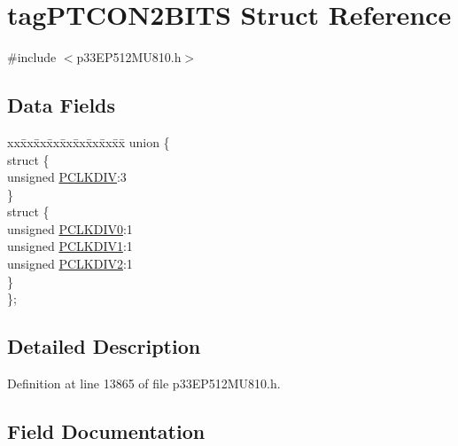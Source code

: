 \hypertarget{structtag_p_t_c_o_n2_b_i_t_s}{}\section{tag\+P\+T\+C\+O\+N2\+B\+I\+TS Struct Reference}
\label{structtag_p_t_c_o_n2_b_i_t_s}


{\ttfamily \#include $<$p33\+E\+P512\+M\+U810.\+h$>$}

\subsection*{Data Fields}
\begin{DoxyCompactItemize}
\item 
\begin{tabbing}
xx\=xx\=xx\=xx\=xx\=xx\=xx\=xx\=xx\=\kill
union \{\\
\>struct \{\\
\>\>unsigned \hyperlink{structtag_p_t_c_o_n2_b_i_t_s_a1d6ebf745e14e65a0a5ce03b92be678f}{PCLKDIV}:3\\
\>\} \\
\>struct \{\\
\>\>unsigned \hyperlink{structtag_p_t_c_o_n2_b_i_t_s_a4babd593aa4d5301df370110fccaab93}{PCLKDIV0}:1\\
\>\>unsigned \hyperlink{structtag_p_t_c_o_n2_b_i_t_s_a47741aceac6a8ba4602843a6e4c31e51}{PCLKDIV1}:1\\
\>\>unsigned \hyperlink{structtag_p_t_c_o_n2_b_i_t_s_a8ddd287d47ae49f7593f9e051fc67c00}{PCLKDIV2}:1\\
\>\} \\
\}; \\

\end{tabbing}\end{DoxyCompactItemize}


\subsection{Detailed Description}


Definition at line 13865 of file p33\+E\+P512\+M\+U810.\+h.



\subsection{Field Documentation}
\mbox{\label{structtag_p_t_c_o_n2_b_i_t_s_a187752039552cec03483074d0dd4bfdb}} 
